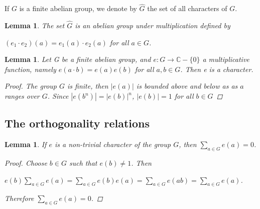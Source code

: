 \documentclass[psamsfonts]{amsart}
\newtheorem{lem}[thm]{Lemma}
\theoremstyle{definition}
\theoremstyle{remark}
\numberwithin{equation}{section}
\begin{document}
			If $G$ is a finite abelian group, we denote by $\hat{G}$ the set of all characters of $G$.
			
			\begin{lem}
				The set $\hat{G}$ is an abelian group under multiplication defined by\\
				\begin{center}
					$(e_1 \cdot e_2)(a) = e_1(a) \cdot e_2(a)$ \hspace{2mm} for all $a \in G$.
				\end{center}
			\end{lem}			
			
			\vspace{2mm}
			
			\begin{lem}
				Let G be a finite abelian group, and $e : G \rightarrow \mathbb{C} - \{0\}$ a multiplicative function, namely $e(a \cdot b) = e(a)e(b)$ for all $a,b \in G$. Then e is a character.
				\begin{proof}
					The group $G$ is finite, then $|e(a)|$ is bounded above and below as as $a$ ranges over $G$. Since $|e(b^n)| = |e(b)|^n$, $|e(b)| = 1$ for all $b \in G$
				\end{proof}
			\end{lem}
			
		\subsection{The orthogonality relations}
			\begin{lem}
				If $e$ is a non-trivial character of the group $G$, then $\sum_{a \in G} e(a) = 0$.
				\begin{proof}
					Choose $b \in G$ such that $e(b) \neq 1$. Then\\
						\begin{center}
							$e(b)\sum_{a \in G} e(a) = \sum_{a \in G} e(b)e(a) = \sum_{a \in G} e(ab) = \sum_{a \in G} e(a)$.
						\end{center}
						\vspace{2mm}
					Therefore $\sum_{a \in G} e(a) = 0$.
				\end{proof}
			\end{lem}		
		
\end{document}

